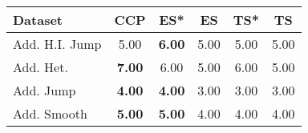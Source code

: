 \begin{tabular}{lccccc}
\toprule
Dataset & CCP & ES* & ES & TS* & TS \\
\midrule
Add. H.I. Jump & 5.00 & \textbf{6.00} & 5.00 & 5.00 & 5.00 \\
Add. Het. & \textbf{7.00} & 6.00 & 5.00 & 6.00 & 5.00 \\
Add. Jump & \textbf{4.00} & \textbf{4.00} & 3.00 & 3.00 & 3.00 \\
Add. Smooth & \textbf{5.00} & \textbf{5.00} & 4.00 & 4.00 & 4.00 \\
\bottomrule
\end{tabular}